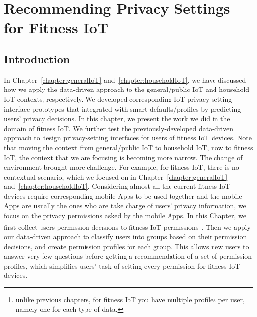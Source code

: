 \chapter{Recommending Privacy Settings for Fitness IoT}\label{chapter:fitnessIoT}

\section{Introduction}\label{fitnessIntro}
In Chapter~\ref{chapter:generalIoT} and~\ref{chapter:householdIoT}, we have discussed how we apply the data-driven approach to the general/public IoT and household IoT contexts, respectively. We developed corresponding IoT privacy-setting interface prototypes that integrated with smart defaults/profiles by predicting users' privacy decisions. In this chapter, we present the work we did in the domain of fitness IoT. We further test the previously-developed data-driven approach to design privacy-setting interfaces for users of fitness IoT devices. Note that moving the context from general/public IoT to household IoT, now to fitness IoT, the context that we are focusing is becoming more narrow. The change of environment brought more challenge. For example, for fitness IoT, there is no contextual scenario, which we focused on in Chapter~\ref{chapter:generalIoT} and~\ref{chapter:householdIoT}. Considering almost all the current fitness IoT devices require corresponding mobile Apps to be used together and the mobile Apps are usually the ones who are take charge of users' privacy information, we focus on the privacy permissions asked by the mobile Apps. In this Chapter, we first collect users permission decisions to fitness IoT permissions\footnote{unlike previous chapters, for fitness IoT you have multiple profiles per user, namely one for each type of data.}. Then we apply our data-driven approach to classify users into groups based on their permission decisions, and create permission profiles for each group. This allows new users to answer very few questions before getting a recommendation of a set of permission profiles, which simplifies users' task of setting every permission for fitness IoT devices.


